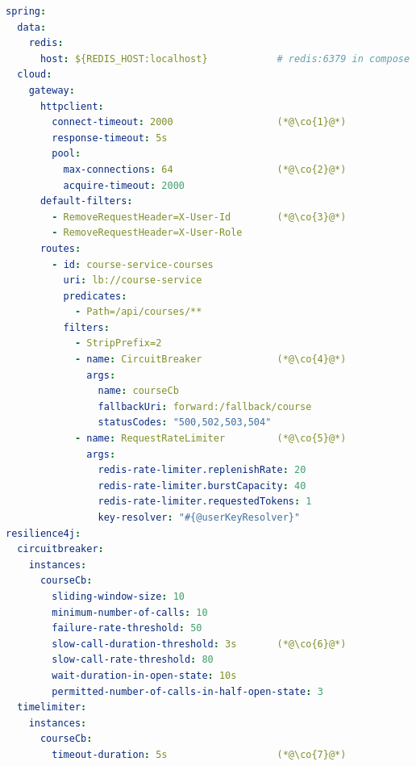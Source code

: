 \begin{lstlisting}[language=yaml]
spring:
  data:
    redis:
      host: ${REDIS_HOST:localhost}            # redis:6379 in compose
  cloud:
    gateway:
      httpclient:
        connect-timeout: 2000                  (*@\co{1}@*)
        response-timeout: 5s
        pool:
          max-connections: 64                  (*@\co{2}@*)
          acquire-timeout: 2000
      default-filters:
        - RemoveRequestHeader=X-User-Id        (*@\co{3}@*)
        - RemoveRequestHeader=X-User-Role
      routes:
        - id: course-service-courses
          uri: lb://course-service
          predicates:
            - Path=/api/courses/**
          filters:
            - StripPrefix=2
            - name: CircuitBreaker             (*@\co{4}@*)
              args:
                name: courseCb
                fallbackUri: forward:/fallback/course
                statusCodes: "500,502,503,504"
            - name: RequestRateLimiter         (*@\co{5}@*)
              args:
                redis-rate-limiter.replenishRate: 20
                redis-rate-limiter.burstCapacity: 40
                redis-rate-limiter.requestedTokens: 1
                key-resolver: "#{@userKeyResolver}"
resilience4j:
  circuitbreaker:
    instances:
      courseCb:
        sliding-window-size: 10
        minimum-number-of-calls: 10
        failure-rate-threshold: 50
        slow-call-duration-threshold: 3s       (*@\co{6}@*)
        slow-call-rate-threshold: 80
        wait-duration-in-open-state: 10s
        permitted-number-of-calls-in-half-open-state: 3
  timelimiter:
    instances:
      courseCb:
        timeout-duration: 5s                   (*@\co{7}@*)
\end{lstlisting}

